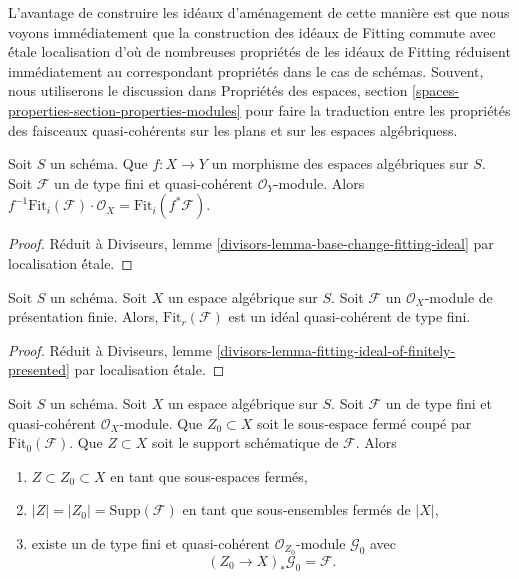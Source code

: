 \medskip\noindent
L'avantage de construire les idéaux d'aménagement de cette manière
est que nous voyons immédiatement que la construction des idéaux de Fitting
commute avec \'étale localisation d'où de nombreuses propriétés de
les idéaux de Fitting réduisent immédiatement au correspondant
propriétés dans le cas de schémas. Souvent, nous utiliserons le
discussion dans Propriétés des espaces, section
\ref{spaces-properties-section-properties-modules}
pour faire la traduction entre les propriétés des faisceaux quasi-cohérents
sur les plans et sur les espaces algébriquess.

\begin{lemma}
\label{lemma-base-change-fitting-ideal}
Soit $S$ un schéma.
Que $f : X \to Y$ un morphisme des espaces algébriques sur $S$.
Soit $\mathcal{F}$ un de type fini et quasi-cohérent $\mathcal{O}_Y$-module.
Alors
$f^{-1}\text{Fit}_i(\mathcal{F}) \cdot \mathcal{O}_X =
\text{Fit}_i(f^*\mathcal{F})$.
\end{lemma}

\begin{proof}
Réduit à
Diviseurs, lemme \ref{divisors-lemma-base-change-fitting-ideal}
par localisation \'étale.
\end{proof}

\begin{lemma}
\label{lemma-fitting-ideal-of-finitely-presented}
Soit $S$ un schéma. Soit $X$ un espace algébrique sur $S$.
Soit $\mathcal{F}$ un $\mathcal{O}_X$-module de présentation finie.
Alors, $\text{Fit}_r(\mathcal{F})$ est un idéal quasi-cohérent de type fini.
\end{lemma}

\begin{proof}
Réduit à
Diviseurs, lemme \ref{divisors-lemma-fitting-ideal-of-finitely-presented}
par localisation \'étale.
\end{proof}

\begin{lemma}
\label{lemma-on-subscheme-cut-out-by-Fit-0}
Soit $S$ un schéma. Soit $X$ un espace algébrique sur $S$.
Soit $\mathcal{F}$ un de type fini et quasi-cohérent $\mathcal{O}_X$-module.
Que $Z_0 \subset X$ soit le sous-espace fermé coupé par
$\text{Fit}_0(\mathcal{F})$.
Que $Z \subset X$ soit le support schématique de $\mathcal{F}$.
Alors
\begin{enumerate}
\item $Z \subset Z_0 \subset X$ en tant que sous-espaces fermés,
\item $|Z| = |Z_0| = \text{Supp}(\mathcal{F})$ en tant que sous-ensembles fermés de $|X|$,
\item existe un de type fini et quasi-cohérent $\mathcal{O}_{Z_0}$-module
$\mathcal{G}_0$ avec
$$
(Z_0 \to X)_*\mathcal{G}_0 = \mathcal{F}.
$$
\end{enumerate}
\end{lemma}

